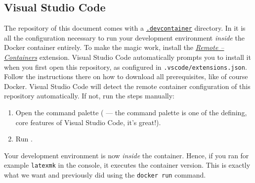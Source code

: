 \subsection{Visual Studio Code}
\label{ch:vsc}

The repository of this document comes with a \href{https://github.com/microsoft/vscode-dev-containers}{\texttt{.devcontainer}} directory.
In it is all the configuration necessary to run your development environment \emph{inside} the Docker container entirely.
To make the magic work, install the \href{https://marketplace.visualstudio.com/items?itemName=ms-vscode-remote.remote-containers}{\emph{Remote -- Containers}} extension.
Visual Studio Code automatically prompts you to install it when you first open this repository, as configured in \texttt{.vscode/extensions.json}.
Follow the instructions there on how to download all prerequisites, like of course Docker.
Visual Studio Code will detect the remote container configuration of this repository automatically.
If not, run the steps manually:
\begin{enumerate}
  \item Open the command palette ( --- the command palette is one of the defining, core features of Visual Studio Code, it's great!).
  \item Run .
\end{enumerate}
Your development environment is now \emph{inside} the container.
Hence, if you ran for example \texttt{latexmk} in the console, it executes the container version.
This is exactly what we want and previously did using the \texttt{docker run} command.

